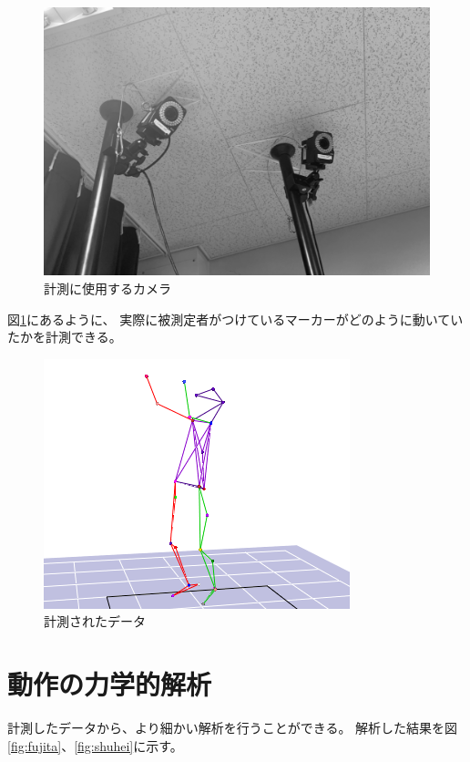 \documentclass{jsarticle}
\begin{document}
\begin{figure}[h]
\begin{minipage}{0.5\hsize}
                \includegraphics[width=0.9\hsize]{img/camera.jpg}
                \caption{計測に使用するカメラ}
            \end{minipage}
        \end{figure}

        図\ref{fig:data}にあるように、
        実際に被測定者がつけているマーカーがどのように動いていたかを計測できる。

        \begin{figure}[h]
            \centering
            \includegraphics[width=0.6\hsize]{img/form.png}
            \caption{計測されたデータ}
            \label{fig:data}
        \end{figure}

    \section{動作の力学的解析}
        計測したデータから、より細かい解析を行うことができる。
        解析した結果を図\ref{fig:fujita}、\ref{fig:shuhei}に示す。
\end{document}
